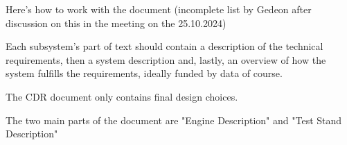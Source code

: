 Here's how to work with the document (incomplete list by Gedeon after discussion on this in the meeting on the 25.10.2024)

Each subsystem's part of text should contain a description of the technical requirements, then a system description and, lastly, an overview of how the system fulfills the requirements, ideally funded by data of course.

The CDR document only contains final design choices.

The two main parts of the document are "Engine Description" and "Test Stand Description"